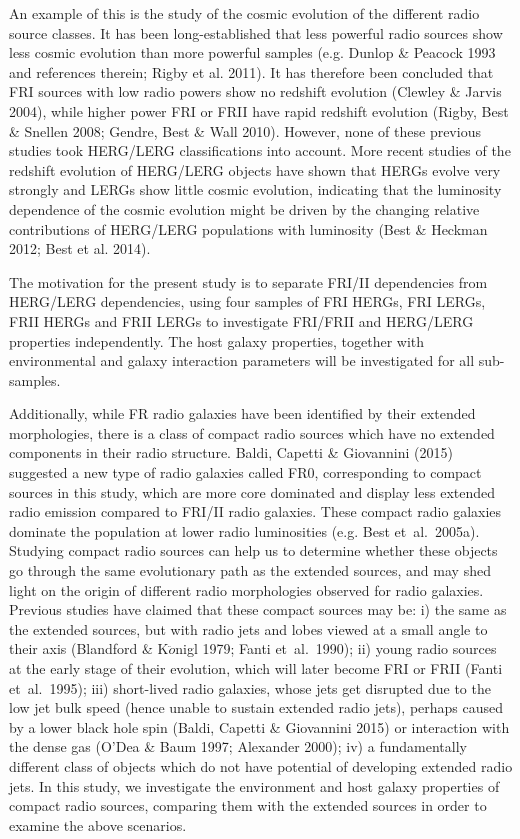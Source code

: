 \documentclass[usenatbib]{mn2e}
\begin{document}
An example of this is the study of the cosmic evolution of the different
radio source classes. It has been long-established that less powerful
radio sources show less cosmic evolution than more powerful samples
(e.g. Dunlop \& Peacock 1993 and references therein; Rigby et al. 2011). It
has therefore been concluded that FRI sources with low radio powers show
no redshift evolution (Clewley \& Jarvis 2004), while higher power FRI or
FRII have rapid redshift evolution (Rigby, Best \& Snellen 2008; Gendre,
Best \& Wall 2010). However, none of these previous studies took HERG/LERG
classifications into account. More recent studies of the redshift
evolution of HERG/LERG objects have shown that HERGs evolve very strongly
and LERGs show little cosmic evolution, indicating that the luminosity
dependence of the cosmic evolution might be driven by the changing
relative contributions of HERG/LERG populations with luminosity (Best \&
Heckman 2012; Best et al. 2014).

The motivation for the present study is to separate FRI/II dependencies
from HERG/LERG dependencies, using four samples of FRI HERGs, FRI LERGs,
FRII HERGs and FRII LERGs to investigate FRI/FRII and HERG/LERG properties
independently. The host galaxy properties, together with environmental and galaxy
interaction parameters will be investigated for all sub-samples.

 Additionally, while FR radio galaxies have been identified by their
extended morphologies, there is a class of compact radio sources
which have no extended components in their radio structure. 
Baldi, Capetti \& Giovannini (2015) suggested a new type of
radio galaxies called FR0, corresponding to compact sources in this study,
which are more core dominated and display less extended radio emission
compared to FRI/II radio galaxies. These compact
radio galaxies dominate the population at lower radio luminosities
(e.g. Best et~al.\ 2005a).
Studying compact radio sources can help us to
determine whether these objects go through the same evolutionary path as
the extended sources, and may shed light on the origin of different radio
morphologies observed for radio galaxies. Previous studies have claimed
that these compact sources may be: i) the same as the extended sources,
but with radio jets and lobes viewed at a small angle to their axis
(Blandford \& K${\ddot{o}}$nigl 1979; Fanti et~al.\ 1990); ii) young radio
sources at the early stage of their evolution, which will later become FRI
or FRII (Fanti et~al.\ 1995); iii) short-lived radio galaxies, whose jets
get disrupted due to the low jet bulk speed (hence unable to sustain extended radio
jets), perhaps caused by a lower black hole spin (Baldi, Capetti \& Giovannini
2015) or interaction with the dense gas (O'Dea \& Baum 1997; Alexander
2000); iv) a fundamentally different class of objects which do not have
potential of developing extended radio jets.  In this study, we
investigate the environment and host galaxy properties of compact radio
sources, comparing them with the extended sources in order to examine the
above scenarios.
\end{document}
